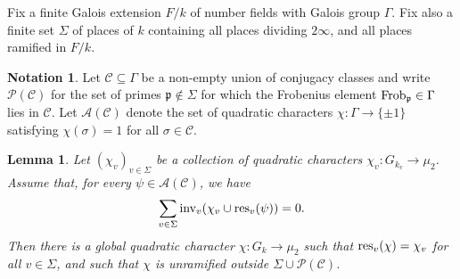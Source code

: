 \documentclass[10pt]{amsart}
\numberwithin{equation}{section}
\newtheorem{lemma}[equation]{Lemma}
\theoremstyle{remark}
\theoremstyle{definition}
\theoremstyle{definition}
\theoremstyle{definition}
\theoremstyle{definition}
\newtheorem{notation}[equation]{Notation}
\theoremstyle{definition}
\theoremstyle{definition}
\theoremstyle{definition}
\theoremstyle{definition}
\begin{document}
Fix a finite Galois extension $F/k$ of number fields with Galois group $\Gamma$. Fix also a finite set $\Sigma$ of places of $k$ containing all places dividing $2\infty$, and all places ramified in $F/k$. 

\begin{notation}
Let $\mathcal{C}\subseteq \Gamma$ be a non-empty union of conjugacy classes and write $\mathcal{P}(\mathcal{C})$ for the set of primes $\mathfrak{p}\notin \Sigma$ for which the Frobenius element $\textup{Frob}_\mathfrak{p}\in \Gamma$ lies in $\mathcal{C}$. Let $\mathcal{A}(\mathcal{C})$ denote the set of quadratic characters $\chi:\Gamma\rightarrow \{\pm 1\}$ satisfying $\chi(\sigma)=1$ for all $\sigma \in \mathcal{C}$. 
\end{notation}
 

\begin{lemma} \label{approximating_extensions_lemma}
Let  $(\chi_v)_{v\in \Sigma}$ be a collection of quadratic characters $\chi_v:G_{k_v}\rightarrow \mu_2$. Assume that, for every $\psi\in \mathcal{A}(\mathcal{C})$, we have
\begin{equation*} \label{reciprocity_condition}
\sum_{v\in \Sigma}\textup{inv}_v(\chi_v\cup \textup{res}_v(\psi))=0.
\end{equation*}
Then there is a global quadratic character $\chi:G_k\rightarrow \mu_2$ such that $\textup{res}_v(\chi)=\chi_v$ for all $v\in \Sigma$, and such that $\chi$ is unramified outside $\Sigma \cup \mathcal{P}(\mathcal{C})$.
\end{lemma}
\end{document}
